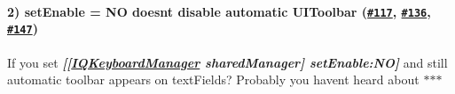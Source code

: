 \paragraph*{2) set\+Enable = NO doesn\textquotesingle{}t disable automatic U\+I\+Toolbar (\href{https://github.com/hackiftekhar/IQKeyboardManager/issues/117}{\tt \#117}, \href{https://github.com/hackiftekhar/IQKeyboardManager/issues/136}{\tt \#136}, \href{https://github.com/hackiftekhar/IQKeyboardManager/issues/147}{\tt \#147})}

If you set {\itshape {\bfseries \mbox{[}\mbox{[}\mbox{\hyperlink{interface_i_q_keyboard_manager}{I\+Q\+Keyboard\+Manager}} shared\+Manager\mbox{]} set\+Enable\+:NO\mbox{]}}} and still automatic toolbar appears on text\+Fields? Probably you haven\textquotesingle{}t heard about $\ast$$\ast$$\ast$ 